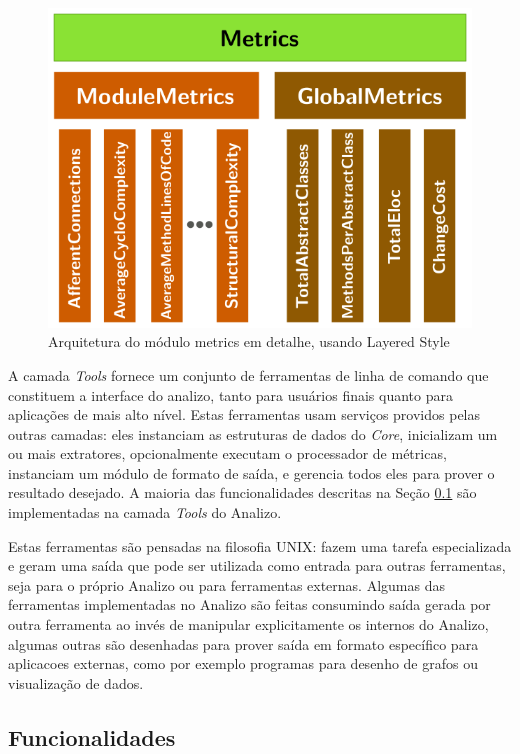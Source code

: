 \begin{figure}[H]
\center
\includegraphics[scale=0.4]{imagens/analizo-metrics-architecture.png}
\caption{Arquitetura do módulo metrics em detalhe, usando Layered Style \cite{Clements2002}}
\label{arquitetura-metrics-analizo}
\end{figure}

A camada {\it Tools} fornece um conjunto de ferramentas de linha de comando que
constituem a interface do analizo, tanto para usuários finais quanto para
aplicações de mais alto nível. Estas ferramentas usam serviços providos pelas
outras camadas: eles instanciam as estruturas de dados do {\it Core},
inicializam um ou mais extratores, opcionalmente executam o processador de
métricas, instanciam um módulo de formato de saída, e gerencia todos eles para
prover o resultado desejado. A maioria das funcionalidades descritas na Seção
\ref{funcionalidades} são implementadas na camada {\it Tools} do Analizo.

Estas ferramentas são pensadas na filosofia UNIX: fazem uma tarefa
especializada e geram uma saída que pode ser utilizada como entrada para outras
ferramentas, seja para o próprio Analizo ou para ferramentas externas. Algumas das
ferramentas implementadas no Analizo são feitas consumindo saída gerada por
outra ferramenta ao invés de manipular explicitamente os internos do Analizo,
algumas outras são desenhadas para prover saída em formato específico para
aplicacoes externas, como por exemplo programas para desenho de grafos ou
visualização de dados.

\subsection{Funcionalidades}\label{funcionalidades}

